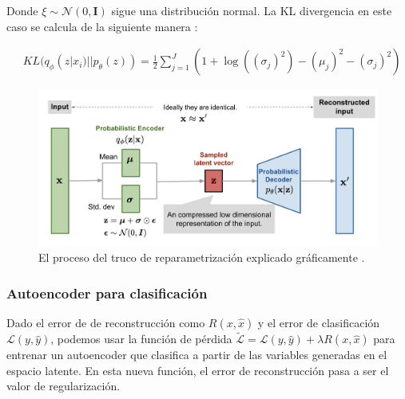 Donde $\xi \sim \mathcal{N}(0,\mathbf{I})$ sigue una distribución normal. La KL divergencia en este caso se calcula de la siguiente manera \cite{kingma2014autoencoding}:

\begin{align}
	&KL(q_\phi(z|x_i)||p_\theta(z)) = \frac{1}{2} \sum^J_{j=1} \left( 1 + \log ((\sigma_j)^2) - (\mu_j)^2 - (\sigma_j)^2 \right)
\end{align}

\begin{figure}[H]
	\includegraphics[scale=0.3]{imagenes/03_Estado_del_arte/vae-gaussian.png}
	\centering
	\caption{El proceso del truco de reparametrización explicado gráficamente \cite{weng2018VAE}.}
	\label{fig:gaussianvae}
\end{figure}

\subsubsection{Autoencoder para clasificación}

Dado el error de de reconstrucción como $R(x,\hat{x})$ y el error de clasificación $\mathcal{L}(y,\hat{y})$, podemos usar la función de pérdida $\tilde{\mathcal{L}} = \mathcal{L}(y,\hat{y}) + \lambda R(x,\hat{x})$ para entrenar un autoencoder que clasifica a partir de las variables generadas en el espacio latente. En esta nueva función, el error de reconstrucción pasa a ser el valor de regularización.

